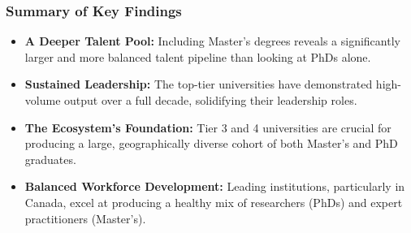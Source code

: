 \documentclass[aspectratio=169]{beamer}
\begin{document}
\begin{frame}
    \frametitle{Summary of Key Findings}
    
    \begin{itemize}
        \item \textbf{A Deeper Talent Pool:} Including Master's degrees reveals a significantly larger and more balanced talent pipeline than looking at PhDs alone.
        \vspace{1em}
        \item \textbf{Sustained Leadership:} The top-tier universities have demonstrated high-volume output over a full decade, solidifying their leadership roles.
        \vspace{1em}
        \item \textbf{The Ecosystem's Foundation:} Tier 3 and 4 universities are crucial for producing a large, geographically diverse cohort of both Master's and PhD graduates.
        \vspace{1em}
        \item \textbf{Balanced Workforce Development:} Leading institutions, particularly in Canada, excel at producing a healthy mix of researchers (PhDs) and expert practitioners (Master's).
    \end{itemize}
\end{frame}
\end{document}
